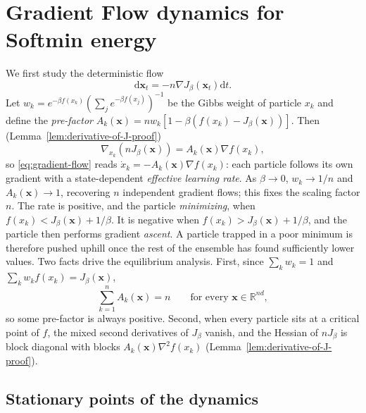 \documentclass{article} %
\newcommand{\dd}{\mathrm d}
\theoremstyle{plain}
\theoremstyle{definition}
\theoremstyle{remark}
\newcommand{\prefactor}[2]{A_{#1}(#2)}
\newcommand{\xx}{\mathbf{x}}
\newcommand{\R}{\mathbb{R}}
\begin{document}
\section{Gradient Flow dynamics for Softmin energy}
\label{sec:gradient-flow-dynamics}

We first study the deterministic flow
\begin{equation}
    \dd\xx_t = -n\nabla J_\beta(\xx_t)\dd t.
    \label{eq:gradient-flow}
\end{equation}
Let $w_k = e^{-\beta f(x_k)}(\sum_j e^{-\beta f(x_j)})^{-1}$ be the Gibbs weight of particle $x_k$ and define the \emph{pre-factor} $\prefactor{k}{\xx} = nw_k\left[1 - \beta(f(x_k) - J_\beta(\xx))\right]$. Then (Lemma~\ref{lem:derivative-of-J-proof})
\begin{equation}
    \nabla_{x_k} (nJ_\beta(\xx)) =\prefactor{k}{\xx} \nabla f(x_k),
    \label{eq:softmin-gradient}
\end{equation}
so \eqref{eq:gradient-flow} reads $\dot x_k=-\prefactor{k}{\xx}\nabla f(x_k)$: each particle follows its own gradient with a state-dependent \emph{effective learning rate}. As $\beta\to0$, $w_k\to1/n$ and $\prefactor{k}{\xx}\to1$, recovering $n$ independent gradient flows; this fixes the scaling factor $n$. The rate is positive, and the particle \emph{minimizing}, when $f(x_k) < J_\beta(\xx) + 1/\beta$. It is negative when $f(x_k) > J_\beta(\xx) + 1/\beta$, and the particle then performs gradient \emph{ascent}. A particle trapped in a poor minimum is therefore pushed uphill once the rest of the ensemble has found sufficiently lower values. Two facts drive the equilibrium analysis. First, since $\sum_k w_k=1$ and $\sum_k w_kf(x_k)=J_\beta(\xx)$,
\begin{equation}
    \sum_{k=1}^n \prefactor{k}{\xx} = n \qquad \text{for every } \xx\in\R^{nd},
    \label{eq:sum-pre-factor}
\end{equation}
so some pre-factor is always positive. Second, when every particle sits at a critical point of $f$, the mixed second derivatives of $J_\beta$ vanish, and the Hessian of $nJ_\beta$ is block diagonal with blocks $\prefactor{k}{\xx}\nabla^2f(x_k)$ (Lemma~\ref{lem:derivative-of-J-proof}).

\subsection{Stationary points of the dynamics}
\label{sec:stationary-points}
\end{document}

